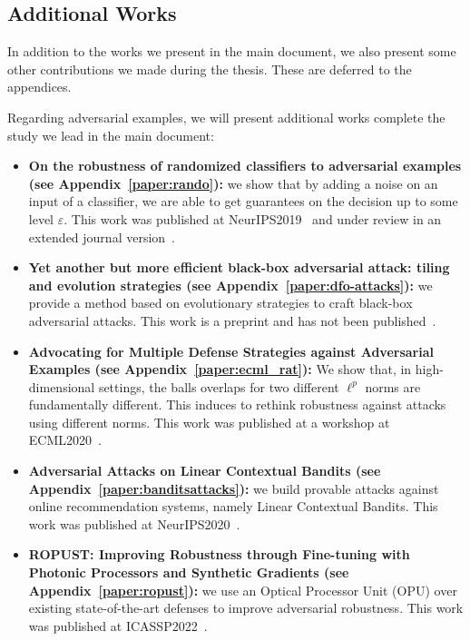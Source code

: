 \subsection{Additional Works}
In addition to the works we present in the main document, we also present some other contributions we made during the thesis. These are deferred to the appendices. 

Regarding adversarial examples, we will present additional works complete the study we lead in the main document:
\begin{itemize}
    \item \textbf{On the robustness of randomized classifiers to adversarial examples
    (see Appendix~\ref{paper:rando}):} we show that by adding a noise on an input of a classifier, we are able to get guarantees on the decision up to some level $\varepsilon$. This work was published at NeurIPS2019~\citep{pinot2019theoretical} and under review in an extended journal version~\citep{pinot2021robustness}.
    \item \textbf{Yet another but more efficient black-box adversarial attack: tiling and evolution strategies (see Appendix~\ref{paper:dfo-attacks}):} we provide a method based on evolutionary strategies to craft black-box adversarial attacks. This work is a preprint and has not been published~\citep{meunier2019yet}.
    \item \textbf{Advocating for Multiple Defense Strategies against Adversarial Examples    (see Appendix~\ref{paper:ecml_rat}):} We show that, in high-dimensional settings, the balls overlaps for two different $\ell^p$ norms are fundamentally different. This induces to rethink robustness against attacks using different norms. This work was published at a workshop at ECML2020~\citep{araujo2020advocating}.
    \item \textbf{Adversarial Attacks on Linear Contextual Bandits (see Appendix~\ref{paper:banditsattacks}):} we build provable attacks against online recommendation systems, namely Linear Contextual Bandits. This work was published at NeurIPS2020~\citep{garcelon2020adversarial}.
    \item \textbf{ROPUST: Improving Robustness through Fine-tuning with Photonic Processors and Synthetic Gradients (see Appendix~\ref{paper:ropust}):} we use an Optical Processor Unit (OPU) over existing state-of-the-art defenses to improve adversarial robustness. This work was published at ICASSP2022~\citep{cappelli2021ropust}.
\end{itemize}

